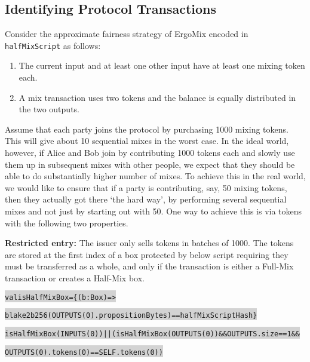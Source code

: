 \documentclass[11pt]{article}
\newcommand\Hi[2][lightgray]{%
	\hspace*{-\fboxsep}%
	\colorbox{#1}{#2}%
	\hspace*{-\fboxsep}%
}
\newcommand{\mixname}{ErgoMix\xspace}
\begin{document}
\subsection{Identifying Protocol Transactions}

Consider the approximate fairness strategy of \mixname encoded in \texttt{halfMixScript} as follows:
\begin{enumerate}
	\item The current input and at least one other input have at least one mixing token each.
	\item A mix transaction uses two tokens and the balance is equally distributed in the two outputs.
	
\end{enumerate}


Assume that each party joins the protocol by purchasing 1000 mixing tokens. This will give about 10 sequential mixes in the worst case. In the ideal world, however, if Alice and Bob join by contributing 1000 tokens each and slowly use them up in subsequent mixes with other people, we expect that they should be able to do substantially higher number of mixes. To achieve this in the real world, we would like to ensure that if a party is contributing, say, 50 mixing tokens, then they actually got there `the hard way', by performing several sequential mixes and not just by starting out with 50. 
One way to achieve this is via tokens with the following two properties. 


\textbf{Restricted entry:} The issuer only sells tokens in batches of 1000. The tokens are stored at the first index of a box protected by below script requiring they must be transferred as a whole, and only if the transaction is either a Full-Mix transaction or creates a Half-Mix box. 

\begin{alltt}
\Hi{val isHalfMixBox = \{(b:Box) => }
 \Hi{blake2b256(OUTPUTS(0).propositionBytes) == halfMixScriptHash\}}
	
\Hi{isHalfMixBox(INPUTS(0)) || (isHalfMixBox(OUTPUTS(0)) && OUTPUTS.size == 1 &&}
                            \Hi{OUTPUTS(0).tokens(0) == SELF.tokens(0))}
\end{alltt}
\end{document}

